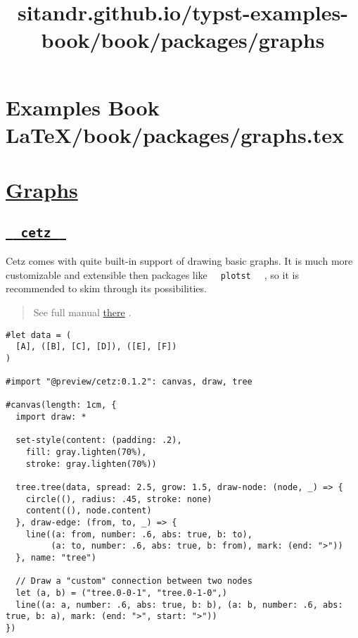 \pandocbounded{}


\section{Examples Book LaTeX/book/packages/graphs.tex}
\title{sitandr.github.io/typst-examples-book/book/packages/graphs}

\section{\texorpdfstring{\hyperref[graphs]{Graphs}}{Graphs}}\label{graphs}

\subsection{\texorpdfstring{\hyperref[cetz]{\texttt{\ }{\texttt{\ cetz\ }}\texttt{\ }}}{  cetz  }}\label{cetz}

Cetz comes with quite built-in support of drawing basic graphs. It is
much more customizable and extensible then packages like
\texttt{\ }{\texttt{\ plotst\ }}\texttt{\ } , so it is recommended to
skim through its possibilities.

\begin{quote}
See full manual
\href{https://github.com/johannes-wolf/cetz/blob/master/manual.pdf?raw=true}{there}
.
\end{quote}

\begin{verbatim}
#let data = (
  [A], ([B], [C], [D]), ([E], [F])
)

#import "@preview/cetz:0.1.2": canvas, draw, tree

#canvas(length: 1cm, {
  import draw: *

  set-style(content: (padding: .2),
    fill: gray.lighten(70%),
    stroke: gray.lighten(70%))

  tree.tree(data, spread: 2.5, grow: 1.5, draw-node: (node, _) => {
    circle((), radius: .45, stroke: none)
    content((), node.content)
  }, draw-edge: (from, to, _) => {
    line((a: from, number: .6, abs: true, b: to),
         (a: to, number: .6, abs: true, b: from), mark: (end: ">"))
  }, name: "tree")

  // Draw a "custom" connection between two nodes
  let (a, b) = ("tree.0-0-1", "tree.0-1-0",)
  line((a: a, number: .6, abs: true, b: b), (a: b, number: .6, abs: true, b: a), mark: (end: ">", start: ">"))
})
\end{verbatim}

